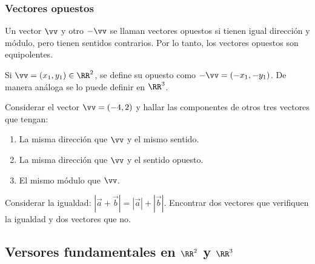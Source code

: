 
\subsubsection*{Vectores opuestos}

Un vector $\vv$ y otro $-\vv$ se llaman vectores opuestos si tienen igual dirección y módulo, pero tienen sentidos contrarios. Por lo tanto, los vectores opuestos  son equipolentes.

Si $\vv = (x_1, y_1)\in\RR^2$, se define su opuesto como $-\vv = (-x_1, -y_1)$. De manera análoga se lo puede definir en $\RR^3$.



\begin{preguntabox}[Ejercicio 1:]
    Considerar el vector $\vv = (-4,2)$ y hallar las componentes de otros tres vectores que tengan:
        \begin{enumerate}[label=(\alph*)]
            \item La misma dirección que $\vv$ y el mismo sentido.

            \item La misma dirección que $\vv$ y el sentido opuesto.

            \item El mismo módulo que $\vv$.
        \end{enumerate}
\end{preguntabox}


\begin{preguntabox}[Ejercicio 2:]
    Considerar la igualdad: $|\vec{a} + \vec{b}| = |\vec{a}| + |\vec{b}|$. Encontrar dos vectores que verifiquen la igualdad y dos vectores que no.
\end{preguntabox}


\subsection{Versores fundamentales en $\RR^2$ y $\RR^3$}





